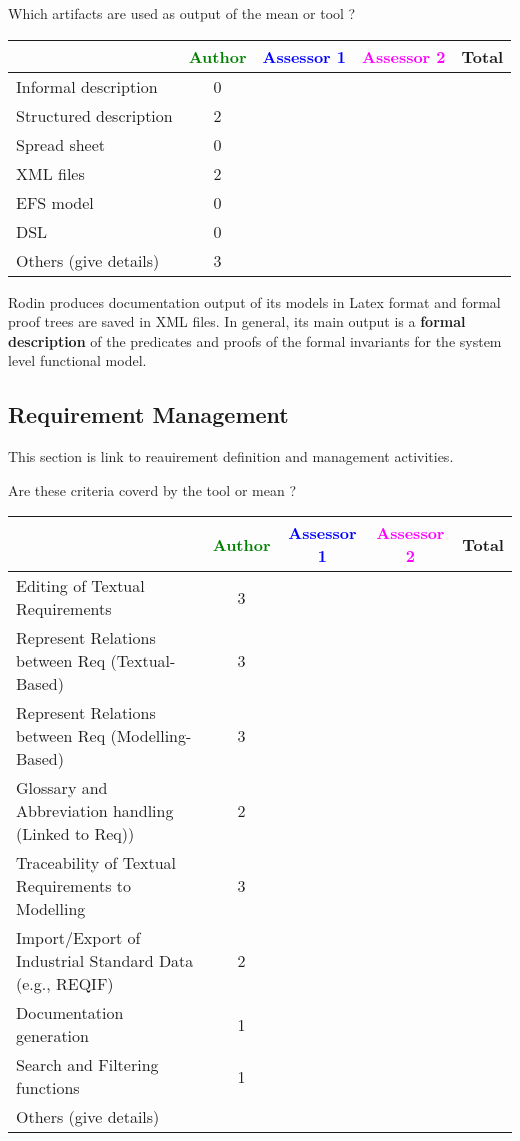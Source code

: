 Which artifacts are used as output of the mean or tool  ? 


\begin{tabular}{|l | c | c | c | c|}
\hline
& \textcolor{green}{Author} & \textcolor{blue}{Assessor 1} & \textcolor{magenta}{Assessor 2} & Total \\
\hline 
Informal description & 0 & & &  \\
\hline
Structured description & 2 & & & \\
\hline
Spread sheet & 0 & & & \\
\hline
XML files & 2 & & & \\
\hline
EFS model & 0 & & & \\
\hline
DSL & 0 & & & \\
\hline
Others (give details) & 3 & & & \\
\hline
\end{tabular}

\begin{author_comment}
  Rodin produces documentation output of its models in Latex format and formal
  proof trees are saved in XML files. In general, its main output is a
  \textbf{formal description} of the predicates and proofs of the formal
  invariants for the system level functional model.
\end{author_comment}

\subsection{Requirement Management}

This section is link to reauirement definition and management activities.

Are these criteria coverd by the tool or mean ? 


\begin{tabular}{|l | c | c | c | c|}
\hline
& \textcolor{green}{Author} & \textcolor{blue}{Assessor 1} & \textcolor{magenta}{Assessor 2} & Total \\
\hline 
Editing of Textual Requirements & 3 & & &  \\
\hline
Represent Relations between Req (Textual-Based) & 3 & & & \\
\hline
Represent Relations between Req (Modelling-Based) & 3 & & & \\
\hline
Glossary and Abbreviation handling (Linked to Req)) & 2& & & \\
\hline
Traceability of Textual Requirements to Modelling & 3 & & & \\
\hline
Import/Export of Industrial Standard Data (e.g., REQIF) & 2 & & & \\
\hline
Documentation generation & 1 & & &  \\
\hline
Search and Filtering functions & 1 & & & \\
\hline
Others (give details) & & & & \\
\hline
\end{tabular}

